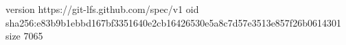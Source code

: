 version https://git-lfs.github.com/spec/v1
oid sha256:e83b9b1ebbd167bf3351640e2cb16426530e5a8c7d57e3513e857f26b0614301
size 7065
